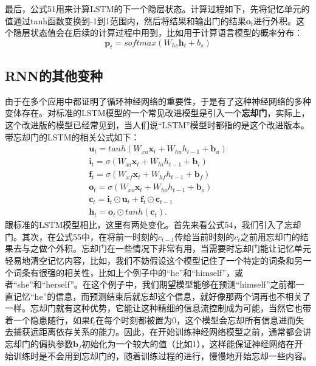 \documentclass[10pt,a4paper]{ctexart}
\begin{document}
最后，公式51用来计算LSTM的下一个隐层状态。计算过程如下，先将记忆单元的值通过tanh函数变换到-1到1范围内，然后将结果和输出门的结果$\textbf{o}_t$进行外积。这个隐层状态值会在后续的计算过程中用到，比如用于计算语言模型的概率分布：
\[
 \textbf{p}_t = softmax(W_{hs}\textbf{h}_t + b_s)
\]

\subsection{RNN的其他变种}
由于在多个应用中都证明了循环神经网络的重要性，于是有了这种神经网络的多种变体存在。对标准的LSTM模型的一个常见改进模型是引入一个\textbf{忘却门}，实际上，这个改进版的模型已经常见到，当人们说“LSTM”模型时都指的是这个改进版本。带忘却门的LSTM的相关公式如下：
\[
 \begin{array}{l}
 \textbf{u}_t = tanh(W_{xu}\textbf{x}_t + W_{hu}h_{t-1} + \textbf{b}_u) \\
 \textbf{i}_t = \sigma (W_{xi}\textbf{x}_t + W_{hi}h_{t-1} + \textbf{b}_i) \\
 \textbf{f}_t = \sigma (W_{xf}\textbf{x}_t + W_{hf}h_{t-1} + \textbf{b}_f) \\
 \textbf{o}_t = \sigma (W_{xo}\textbf{x}_t + W_{ho}h_{t-1} + \textbf{b}_o) \\
 \textbf{c}_t = \textbf{i}_t \odot \textbf{u}_t + \textbf{f}_t \odot \textbf{c}_{t-1} \\
 \textbf{h}_t = \textbf{o}_t \odot tanh(\textbf{c}_t).
 \end{array}
\]
跟标准的LSTM模型相比，这里有两处变化。首先来看公式54，我们引入了忘却门。其次，在公式55中，在将前一时刻的$c_{t-1}$传给当前时刻的$c_t$之前用忘却门的结果去与之做个外积。忘却门在一些情况下非常有用，当需要时忘却门能让记忆单元轻易地清空记忆内容，比如，我们不妨假设这个模型记住了一个特定的词条和另一个词条有很强的相关性，比如上个例子中的“he”和“himself”，或者“she”和“herself”。在这个例子中，我们期望模型能够在预测“himself”之前都一直记忆“he”的信息，而预测结束后就忘却这个信息，就好像那两个词再也不相关了一样。忘却门就有这种优势，它能让这种精细的信息流控制成为可能，当然它也带着一个隐患随行，如果$\textbf{f}_t$在每个时刻都被置为0，这个模型会忘却所有信息进而失去捕获远距离依存关系的能力。因此，在开始训练神经网络模型之前，通常都会讲忘却门的偏执参数$\textbf{b}_f$初始化为一个较大的值（比如1），这样能保证神经网络在开始训练时是不会用到忘却门的，随着训练过程的进行，慢慢地开始忘却一些内容。
\end{document}
